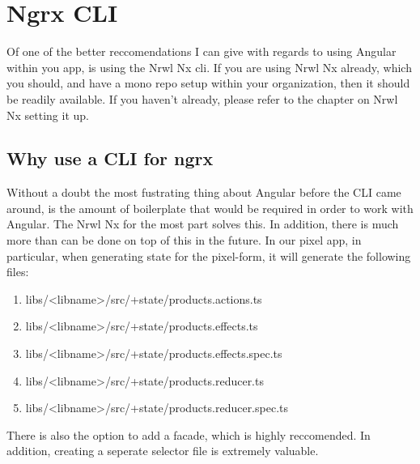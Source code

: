 \maketitle{}
\section{ Ngrx CLI }

Of one of the better reccomendations I can give with regards to using Angular
within you app, is using the Nrwl Nx cli. If you are using Nrwl Nx already,
which you should, and have a mono repo setup within your organization, then
it should be readily available. If you haven't already, please refer to the
chapter on Nrwl Nx setting it up.

\subsection{ Why use a CLI for ngrx }
Without a doubt the most fustrating thing about Angular before the CLI came
around, is the amount of boilerplate that would be required in order to work
with Angular. The Nrwl Nx for the most part solves this. In addition, there is
much more than can be done on top of this in the future. In our pixel app, in
particular, when generating state for the pixel-form, it will generate the
following files:
\begin{enumerate}
  \item libs/<libname>/src/+state/products.actions.ts
  \item libs/<libname>/src/+state/products.effects.ts
  \item libs/<libname>/src/+state/products.effects.spec.ts
  \item libs/<libname>/src/+state/products.reducer.ts
  \item libs/<libname>/src/+state/products.reducer.spec.ts
\end{enumerate}

There is also the option to add a facade, which is highly reccomended. In
addition, creating a seperate selector file is extremely valuable.  
